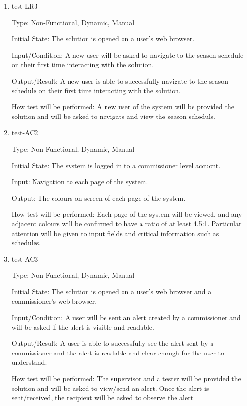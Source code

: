 \documentclass[12pt, titlepage]{article}
\begin{document}
\begin{enumerate}
  \item{test-LR3\\}
  
  Type: Non-Functional, Dynamic, Manual
            
  Initial State: The solution is opened on a user's web browser.
            
  Input/Condition: A new user will be asked to navigate to the season schedule on their first
  time interacting with the solution.
            
  Output/Result: A new user is able to successfully navigate to the season schedule on
  their first time interacting with the solution.
            
  How test will be performed: A new user of the system will be provided the solution and
  will be asked to navigate and view the season schedule.

  \item{test-AC2\\}

  Type: Non-Functional, Dynamic, Manual

  Initial State: The system is logged in to a commissioner level accuont.

  Input: Navigation to each page of the system.

  Output: The colours on screen of each page of the system.

  How test will be performed: Each page of the system will be viewed, and any
  adjacent colours will be confirmed to have a ratio of at least 4.5:1.
  Particular attention will be given to input fields and critical information
  such as schedules.

  \item{test-AC3\\}
  
  Type: Non-Functional, Dynamic, Manual
            
  Initial State: The solution is opened on a user's web browser and a commissioner's web
  browser.
            
  Input/Condition: A user will be sent an alert created by a commissioner and will be asked
  if the alert is visible and readable.
            
  Output/Result: A user is able to successfully see the alert sent by a commissioner and
  the alert is readable and clear enough for the user to understand.
            
  How test will be performed: The supervisor and a tester will be provided the solution and
  will be asked to view/send an alert. Once the alert is sent/received, the recipient will
  be asked to observe the alert.


\end{enumerate}
\end{document}

